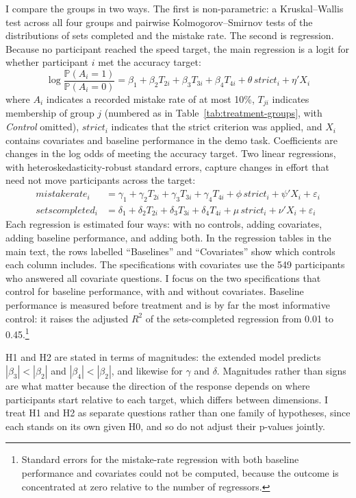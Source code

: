 \documentclass[12pt, letterpaper]{article}
\newcommand{\CtrlName}{Control}
\newcommand{\Ctrl}{\textit{\CtrlName}}
\begin{document}
I compare the groups in two ways. The first is non-parametric: a Kruskal--Wallis test across all four groups and pairwise Kolmogorov--Smirnov tests of the distributions of sets completed and the mistake rate. The second is regression. Because no participant reached the speed target, the main regression is a logit for whether participant $i$ met the accuracy target:
\[
\log \frac{\mathbb{P}(A_i = 1)}{\mathbb{P}(A_i = 0)} = \beta_{1} + \beta_2 T_{2i} +\beta_3 T_{3i} +\beta_4 T_{4i} + \theta\, strict_i + \eta' X_i \tag{1}
\]
where $A_i$ indicates a recorded mistake rate of at most 10\%, $T_{ji}$ indicates membership of group $j$ (numbered as in Table~\ref{tab:treatment-groups}, with \Ctrl{} omitted), $strict_i$ indicates that the strict criterion was applied, and $X_i$ contains covariates and baseline performance in the demo task. Coefficients are changes in the log odds of meeting the accuracy target. Two linear regressions, with heteroskedasticity-robust standard errors, capture changes in effort that need not move participants across the target:
\begin{align*}
mistakerate_i &= \gamma_1 + \gamma_2 T_{2i} + \gamma_3 T_{3i} + \gamma_4 T_{4i} + \phi\, strict_i + \psi' X_i + \varepsilon_i \tag{2} \\
setscompleted_i &= \delta_1 + \delta_2 T_{2i} + \delta_3 T_{3i} + \delta_4 T_{4i} + \mu\, strict_i + \nu' X_i + \varepsilon_i \tag{3}
\end{align*}
Each regression is estimated four ways: with no controls, adding covariates, adding baseline performance, and adding both. In the regression tables in the main text, the rows labelled ``Baselines'' and ``Covariates'' show which controls each column includes. The specifications with covariates use the 549 participants who answered all covariate questions. I focus on the two specifications that control for baseline performance, with and without covariates. Baseline performance is measured before treatment and is by far the most informative control: it raises the adjusted $R^2$ of the sets-completed regression from 0.01 to 0.45.\footnote{Standard errors for the mistake-rate regression with both baseline performance and covariates could not be computed, because the outcome is concentrated at zero relative to the number of regressors.}

H1 and H2 are stated in terms of magnitudes: the extended model predicts $|\beta_3| < |\beta_2|$ and $|\beta_4| < |\beta_2|$, and likewise for $\gamma$ and $\delta$. Magnitudes rather than signs are what matter because the direction of the response depends on where participants start relative to each target, which differs between dimensions. I treat H1 and H2 as separate questions rather than one family of hypotheses, since each stands on its own given H0, and so do not adjust their p-values jointly.
\end{document}
